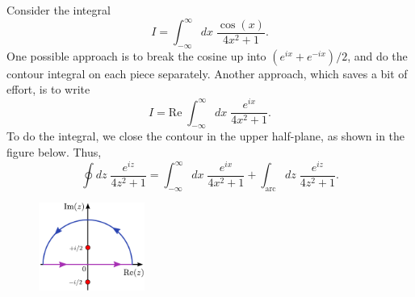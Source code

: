 \documentclass[10pt,a4paper]{article}
\begin{document}
Consider the integral
\begin{equation}
I = \int_{-\infty}^\infty dx\; \frac{\cos(x)}{4x^2 + 1}.
\end{equation}
One possible approach is to break the cosine up into
$(e^{ix} + e^{-ix})/2$, and do the contour integral on each piece
separately. Another approach, which saves a bit of effort, is to write
\begin{equation}
I = \mathrm{Re} \; \int_{-\infty}^\infty dx\; \frac{e^{ix}}{4x^2 + 1}.
\end{equation}
To do the integral, we close the contour in the upper half-plane, as
shown in the figure below.  Thus,
\begin{equation}
  \oint dz \; \frac{e^{iz}}{4z^2 + 1} = \int_{-\infty}^\infty dx\; \frac{e^{ix}}{4x^2 + 1} + \int_{\mathrm{arc}} dz \; \frac{e^{iz}}{4z^2 + 1}.
  \label{contourparts}
\end{equation}

\begin{figure}[h]
  \centering\includegraphics[width=0.31\textwidth]{contour_example3}
\end{figure}
\end{document}
